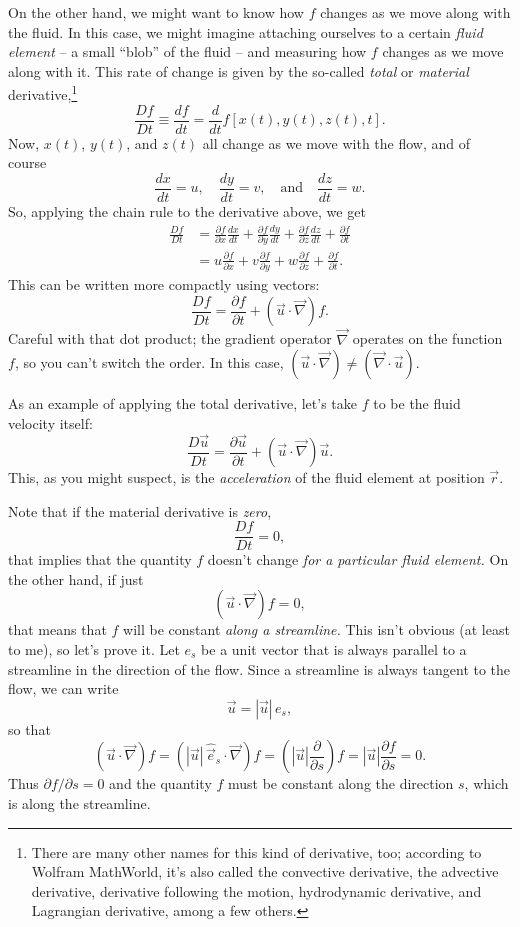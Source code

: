 On the other hand, we might want to know how $f$ changes as we move along with the fluid.  In this case, we might imagine attaching ourselves to a certain \emph{fluid element} -- a small ``blob'' of the fluid -- and measuring how $f$ changes as we move along with it.  This rate of change is given by the so-called \emph{total} or \emph{material} derivative,\footnote{There are many other names for this kind of derivative, too; according to Wolfram MathWorld, it's also called the convective derivative, the advective derivative, derivative following the motion, hydrodynamic derivative, and Lagrangian derivative, among a few others.}
\[
\frac{Df}{Dt} \equiv \frac{df}{dt} = \frac{d}{dt} f[x(t), y(t), z(t), t].
\]
Now, $x(t)$, $y(t)$, and $z(t)$ all change as we move with the flow, and of course
\[
\frac{dx}{dt} = u, \quad \frac{dy}{dt} = v, \quad \text{and} \quad \frac{dz}{dt} = w.
\]
So, applying the chain rule to the derivative above, we get
\begin{align*}
\frac{Df}{Dt} & =  \frac{\partial f}{\partial x}\frac{dx}{dt} + \frac{\partial f}{\partial y}\frac{dy}{dt} + \frac{\partial f}{\partial z}\frac{dz}{dt} + \frac{\partial f}{\partial t} \\
& = u \frac{\partial f}{\partial x} + v \frac{\partial f}{\partial y} + w \frac{\partial f}{\partial z} + \frac{\partial f}{\partial t}.
\end{align*}
This can be written more compactly using vectors:
\begin{equation}
\label{eq_total_deriv}
\boxed{
\frac{Df}{Dt} = \frac{\partial f}{\partial t} + (\vec{u} \cdot \vec{\nabla}) f.
}
\end{equation}
Careful with that dot product; the gradient operator $\vec{\nabla}$ operates on the function $f$, so you can't switch the order.  In this case, $(	\vec{u} \cdot \vec{\nabla}) \neq (\vec{\nabla} \cdot \vec{u})$.

As an example of applying the total derivative, let's take $f$ to be the fluid velocity itself:
\begin{equation}
\label{eq_accel}
\boxed{
\frac{D \vec{u}}{Dt} = \frac{\partial \vec{u}}{\partial t} + (\vec{u} \cdot \vec{\nabla}) \vec{u}.
}
\end{equation}
This, as you might suspect, is the \emph{acceleration} of the fluid element at position $\vec{r}$.

Note that if the material derivative is \emph{zero},
\[
\frac{Df}{Dt} = 0,
\]
that implies that the quantity $f$ doesn't change \emph{for a particular fluid element.}  On the other hand, if just
\[
(\vec{u} \cdot \vec{\nabla}) f = 0,
\]
that means that $f$ will be constant \emph{along a streamline.}  This isn't obvious (at least to me), so let's prove it.  Let $\unit{e}_s$ be a unit vector that is always parallel to a streamline in the direction of the flow.  Since a streamline is always tangent to the flow, we can write
\[
\vec{u} = |\vec{u}| \, \unit{e}_s,
\]
so that
\[
(\vec{u} \cdot \vec{\nabla}) f = (|\vec{u}| \, \hat{\vec{e}}_s \cdot \vec{\nabla}) f = (|\vec{u}| \frac{\partial }{\partial s} )f = |\vec{u}| \frac{\partial f}{\partial s} = 0.
\]
Thus $\partial f / \partial s = 0$ and the quantity $f$ must be constant along the direction $s$, which is along the streamline.

